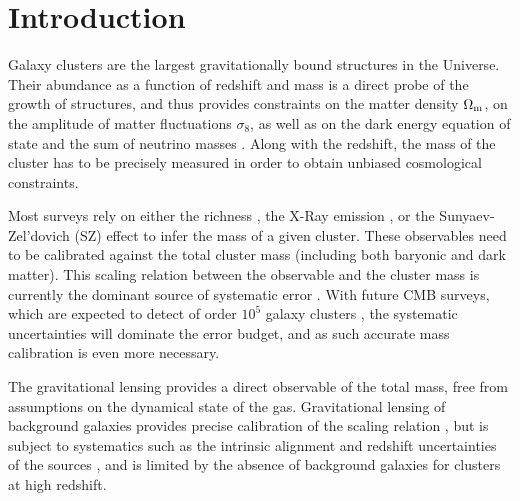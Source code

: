 \documentclass[prd, superscriptaddress, tightenlines, longbibliography, nofootinbib, eqsecnum, amsfonts, amsmath, floatfix, twocolumn, notitlepage]{revtex4-2}
\begin{document}
\tableofcontents
\section{Introduction}
\setcounter{footnote}{0}

Galaxy clusters are the largest gravitationally bound structures in the Universe. Their abundance as a function of redshift and mass is a direct probe of the growth of structures, and thus provides constraints on the matter density $\Omega_{\rm m}$, on the amplitude of matter fluctuations $\sigma_8$, as well as on the dark energy equation of state and the sum of neutrino masses \cite{Vikhlinin:2008ym,Sehgal:2010ca,Allen:2011zs,Planck:2013lkt, Mantz:2014xba,Mantz:2014paa, Planck:2015lwi,SPT:2016izt, SPT:2018njh, SPT:2021efh, Raghunathan:2021zfi}. Along with the redshift, the mass of the cluster has to be precisely measured in order to obtain unbiased cosmological constraints.

Most surveys rely on either the richness \cite[e.g.][]{Koester:2007bj,DES:2015mqu,Andreon:2016eck, Farahi:2016xux,Simet:2016mzg}, the X-Ray emission \cite[e.g.][]{Arnaud:2005ur, Arnaud:2007br, Vikhlinin:2008ym}, or the Sunyaev-Zel'dovich (SZ) effect \cite[e.g.][]{Vanderlinde:2010eb, Planck:2013lkt,Planck:2015lwi} to infer the mass of a given cluster. These observables need to be calibrated against the total cluster mass (including both baryonic and dark matter).
This scaling relation between the observable and the cluster mass is currently the dominant source of systematic error \cite{Pratt:2019cnf, Salvati:2020exw, Salvati:2021gkt}.
With future CMB surveys, which are expected to detect of order $10^5$ galaxy clusters \cite{Madhavacheril:2017onh, SimonsObservatory:2018koc, CMB-S4:2016ple, Raghunathan:2021zfi}, the systematic uncertainties will dominate the error budget, and as such accurate mass calibration is even more necessary.

The gravitational lensing provides a direct observable of the total mass, free from assumptions on the dynamical state of the gas.
Gravitational lensing of background galaxies provides precise calibration of the scaling relation \cite{vonderLinden:2014haa, Hoekstra:2015gda, Smith:2015qhs, Sereno:2017zcn, Penna-Lima:2016tvo, Bellagamba:2018gec,Miyatake:2018lpb, Umetsu:2020wlf}, but is subject to systematics such as the intrinsic alignment and redshift uncertainties of the sources \cite{Becker:2010xj}, and is limited by the absence of background galaxies for clusters at high redshift.
\end{document}
